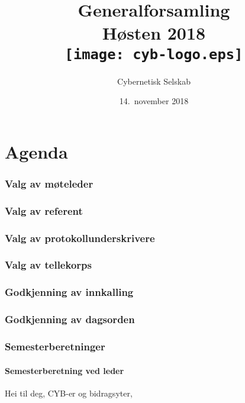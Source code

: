 \documentclass[10pt,norsk,a4paper]{article}
\title{Generalforsamling \\
	Høsten 2018\\[3cm]
	\texttt{[image: cyb-logo.eps]}\\[-.5cm]}
\date{14.\ november 2018}
\author{Cybernetisk Selskab}
\begin{document}
\maketitle{}
\newpage
\tableofcontents

\part*{Agenda}

\section{Valg av møteleder}

\section{Valg av referent}

\section{Valg av protokollunderskrivere}

\section{Valg av tellekorps}

\section{Godkjenning av innkalling}

\section{Godkjenning av dagsorden}


\section{Semesterberetninger}
\subsection{Semesterberetning ved leder}

Hei til deg, CYB-er og bidragsyter,
\end{document}
